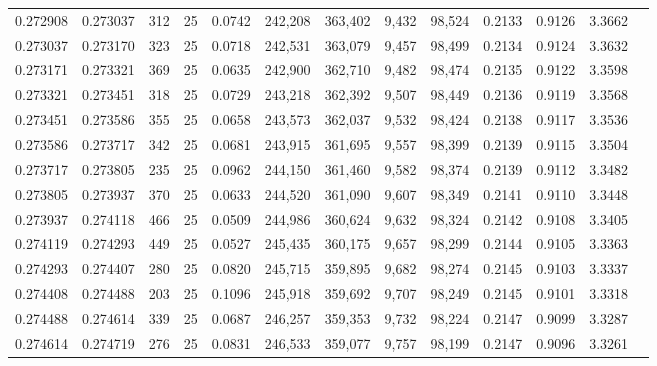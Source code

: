 \begin{tabular}{rrrrrrrrrrrrr}
0.272908 & 0.273037 &   312 &  25 &                                     0.0742 & 242,208 & 363,402 &   9,432 &  98,524 & 0.2133 & 0.9126 & 3.3662 \\
0.273037 & 0.273170 &   323 &  25 &                                     0.0718 & 242,531 & 363,079 &   9,457 &  98,499 & 0.2134 & 0.9124 & 3.3632 \\
0.273171 & 0.273321 &   369 &  25 &                                     0.0635 & 242,900 & 362,710 &   9,482 &  98,474 & 0.2135 & 0.9122 & 3.3598 \\
0.273321 & 0.273451 &   318 &  25 &                                     0.0729 & 243,218 & 362,392 &   9,507 &  98,449 & 0.2136 & 0.9119 & 3.3568 \\
0.273451 & 0.273586 &   355 &  25 &                                     0.0658 & 243,573 & 362,037 &   9,532 &  98,424 & 0.2138 & 0.9117 & 3.3536 \\
0.273586 & 0.273717 &   342 &  25 &                                     0.0681 & 243,915 & 361,695 &   9,557 &  98,399 & 0.2139 & 0.9115 & 3.3504 \\
0.273717 & 0.273805 &   235 &  25 &                                     0.0962 & 244,150 & 361,460 &   9,582 &  98,374 & 0.2139 & 0.9112 & 3.3482 \\
0.273805 & 0.273937 &   370 &  25 &                                     0.0633 & 244,520 & 361,090 &   9,607 &  98,349 & 0.2141 & 0.9110 & 3.3448 \\
0.273937 & 0.274118 &   466 &  25 &                                     0.0509 & 244,986 & 360,624 &   9,632 &  98,324 & 0.2142 & 0.9108 & 3.3405 \\
0.274119 & 0.274293 &   449 &  25 &                                     0.0527 & 245,435 & 360,175 &   9,657 &  98,299 & 0.2144 & 0.9105 & 3.3363 \\
0.274293 & 0.274407 &   280 &  25 &                                     0.0820 & 245,715 & 359,895 &   9,682 &  98,274 & 0.2145 & 0.9103 & 3.3337 \\
0.274408 & 0.274488 &   203 &  25 &                                     0.1096 & 245,918 & 359,692 &   9,707 &  98,249 & 0.2145 & 0.9101 & 3.3318 \\
0.274488 & 0.274614 &   339 &  25 &                                     0.0687 & 246,257 & 359,353 &   9,732 &  98,224 & 0.2147 & 0.9099 & 3.3287 \\
0.274614 & 0.274719 &   276 &  25 &                                     0.0831 & 246,533 & 359,077 &   9,757 &  98,199 & 0.2147 & 0.9096 & 3.3261 \\

\end{tabular}
